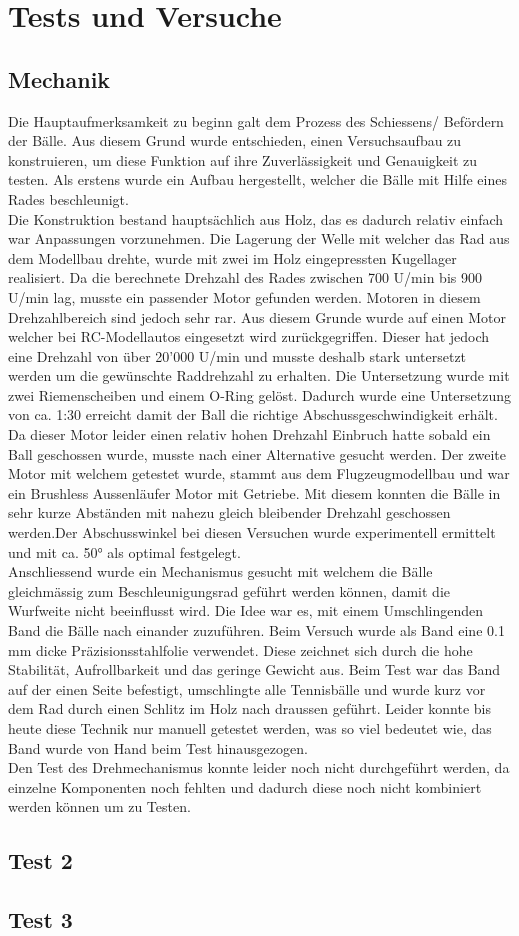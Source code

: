 \section{Tests und Versuche}

\subsection{Mechanik}


Die Hauptaufmerksamkeit zu beginn galt dem Prozess des Schiessens/ Befördern der Bälle. Aus diesem Grund wurde entschieden, einen Versuchsaufbau zu konstruieren, um diese Funktion auf ihre Zuverlässigkeit und Genauigkeit zu testen. Als erstens wurde ein Aufbau hergestellt, welcher die Bälle mit Hilfe eines Rades beschleunigt.
%
%
\\Die Konstruktion bestand hauptsächlich aus Holz, das es dadurch relativ einfach war Anpassungen vorzunehmen. Die Lagerung der Welle mit welcher das Rad aus dem Modellbau drehte, wurde mit zwei im Holz eingepressten Kugellager realisiert. Da die berechnete Drehzahl des Rades zwischen 700 U/min bis 900 U/min lag, musste ein passender Motor gefunden werden. Motoren in diesem Drehzahlbereich sind jedoch sehr rar. Aus diesem Grunde wurde auf einen Motor welcher bei RC-Modellautos eingesetzt wird zurückgegriffen. Dieser hat jedoch eine Drehzahl von über 20'000 U/min und musste deshalb stark untersetzt werden um die gewünschte Raddrehzahl zu erhalten. Die Untersetzung wurde mit zwei Riemenscheiben und einem O-Ring gelöst. Dadurch wurde eine Untersetzung von ca. 1:30 erreicht damit der Ball die richtige Abschussgeschwindigkeit erhält. Da dieser Motor leider einen relativ hohen Drehzahl Einbruch hatte sobald ein Ball geschossen wurde, musste nach einer Alternative gesucht werden. Der zweite Motor mit welchem getestet wurde, stammt aus dem Flugzeugmodellbau und war ein Brushless Aussenläufer Motor mit Getriebe. Mit diesem konnten die Bälle in sehr kurze Abständen mit nahezu gleich bleibender Drehzahl geschossen werden.Der Abschusswinkel bei diesen Versuchen wurde experimentell ermittelt und mit ca. 50° als optimal festgelegt. 
%
%
\\Anschliessend wurde ein Mechanismus gesucht mit welchem die Bälle gleichmässig zum Beschleunigungsrad geführt werden können, damit die Wurfweite nicht beeinflusst wird. Die Idee war es, mit einem Umschlingenden Band die Bälle nach einander zuzuführen. Beim Versuch wurde als Band eine 0.1 mm dicke Präzisionsstahlfolie verwendet. Diese zeichnet sich durch die hohe Stabilität, Aufrollbarkeit und das geringe Gewicht aus. Beim Test war das Band auf der einen Seite befestigt, umschlingte alle Tennisbälle und wurde kurz vor dem Rad durch einen Schlitz im Holz nach draussen geführt. Leider konnte bis heute diese Technik nur manuell getestet werden, was so viel bedeutet wie, das Band wurde von Hand beim Test hinausgezogen.\\
%
Den Test des Drehmechanismus konnte leider noch nicht durchgeführt werden, da einzelne Komponenten noch fehlten und dadurch diese noch nicht kombiniert werden können um zu Testen.




\subsection{Test 2}

\subsection{Test 3}